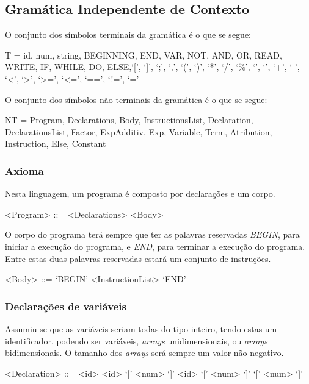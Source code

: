 \subsection{Gramática Independente de Contexto}
\label{subsec:gramatica:desenho}

O conjunto dos símbolos terminais da gramática é o que se segue:

T = {id, num, string, BEGINNING, END, VAR, NOT, AND, OR, READ, WRITE, IF,
	WHILE, DO, ELSE,`[', `]', `;', `,', `(', `)', `*', `/', `\%', `{', `}', `+',
`-', `<', `>', `>=', `<=', `==', `!=', `='}


O conjunto dos símbolos não-terminais da gramática é o que se segue:

NT = {Program, Declarations, Body, InstructionsList, Declaration,
DeclarationsList, Factor, ExpAdditiv, Exp, Variable, Term, Atribution,
Instruction, Else, Constant }
\subsubsection{Axioma}
\label{subsec:subsubsec:axioma:desenho}

Nesta linguagem, um programa é composto por declarações e um corpo.

\begin{grammar}
<Program> ::= <Declarations> <Body> 
\end{grammar}

O corpo do programa terá sempre que ter as palavras reservadas \emph{BEGIN},
para iniciar a execução do programa, e \emph{END}, para terminar a execução do
programa. Entre estas duas palavras reservadas estará um conjunto de instruções.  

\begin{grammar}
<Body> ::= `BEGIN' <InstructionList> `END'
\end{grammar}


\subsubsection{Declarações de variáveis}
\label{subsec:subsubsec:declaracoes:desenho}

Assumiu-se que as variáveis seriam todas do tipo inteiro, tendo estas um
identificador, podendo ser variáveis, \emph{arrays} unidimensionais, ou
\emph{arrays} bidimensionais. O tamanho dos \emph{arrays} será sempre um valor
não negativo.   

\begin{grammar}
<Declaration> ::= <id>
\alt <id> `[' <num> `]'
\alt <id> `[' <num> `]' `[' <num> `]' 
\end{grammar}

